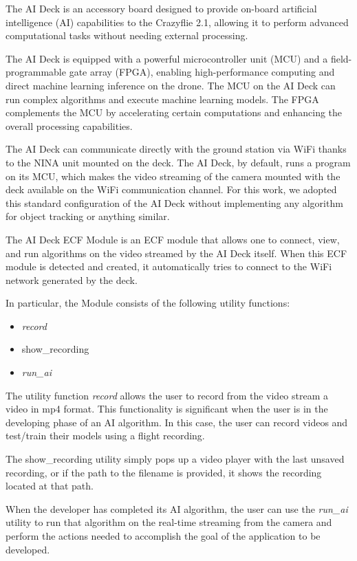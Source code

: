 The AI Deck is an accessory board designed to provide on-board artificial intelligence (AI) capabilities to the Crazyflie 2.1, allowing it to perform advanced computational tasks without needing external processing.

The AI Deck is equipped with a powerful microcontroller unit (MCU) and a field-programmable gate array (FPGA), enabling high-performance computing and direct machine learning inference on the drone.
The MCU on the AI Deck can run complex algorithms and execute machine learning models. 
The FPGA complements the MCU by accelerating certain computations and enhancing the overall processing capabilities.

The AI Deck can communicate directly with the ground station via WiFi thanks to the NINA unit mounted on the deck.
The AI Deck, by default, runs a program on its MCU, which makes the video streaming of the camera mounted with the deck available on the WiFi communication channel.
For this work, we adopted this standard configuration of the AI Deck without implementing any algorithm for object tracking or anything similar.

The AI Deck ECF Module is an ECF module that allows one to connect, view, and run algorithms on the video streamed by the AI Deck itself.
When this ECF module is detected and created, it automatically tries to connect to the WiFi network generated by the deck.

In particular, the Module consists of the following utility functions:
\begin{itemize}
    \item \textit{record}
    \item show\_recording
    \item \textit{run\_ai}
\end{itemize}

The utility function \textit{record} allows the user to record from the video stream a video in mp4 format. 
This functionality is significant when the user is in the developing phase of an AI algorithm. 
In this case, the user can record videos and test/train their models using a flight recording.

The show\_recording utility simply pops up a video player with the last unsaved recording, or if the path to the filename is provided, it shows the recording located at that path.

When the developer has completed its AI algorithm, the user can use the \textit{run\_ai} utility to run that algorithm on the real-time streaming from the camera and perform the actions needed to accomplish the goal of the application to be developed.


